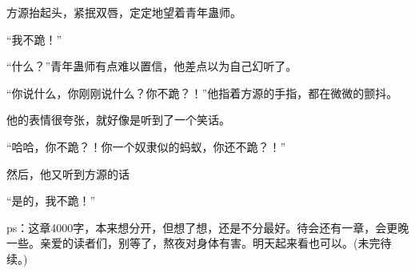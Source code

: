\begin{this_body}
方源抬起头，紧抿双唇，定定地望着青年蛊师。

“我不跪！”

“什么？”青年蛊师有点难以置信，他差点以为自己幻听了。

“你说什么，你刚刚说什么？你不跪？！”他指着方源的手指，都在微微的颤抖。

他的表情很夸张，就好像是听到了一个笑话。

“哈哈，你不跪？！你一个奴隶似的蚂蚁，你还不跪？！”

然后，他又听到方源的话

“是的，我不跪！”

ps：这章4000字，本来想分开，但想了想，还是不分最好。待会还有一章，会更晚一些。亲爱的读者们，别等了，熬夜对身体有害。明天起来看也可以。(未完待续。)

\end{this_body}

